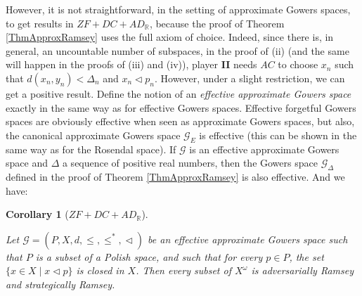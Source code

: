 \documentclass[a4paper,11pt]{article}
\newtheorem{cor}[thm]{Corollary}
\theoremstyle{definition}
\numberwithin{equation}{section}
\newcommand{\R}{\mathbb{R}}
\newcommand{\G}{\mathcal{G}}
\newcommand{\II}{\textbf{II}}
\begin{document}
However, it is not straightforward, in the setting of approximate Gowers spaces, to get results in $ZF + DC + AD_\R$, because the proof of Theorem \ref{ThmApproxRamsey} uses the full axiom of choice. Indeed, since there is, in general, an uncountable number of subspaces, in the proof of (ii) (and the same will happen in the proofs of (iii) and (iv)), player \II{} needs $AC$ to choose $x_n$ such that $d(x_n, y_n) < \Delta_n$ and $x_n \vartriangleleft p_n$. However, under a slight restriction, we can get a positive result. Define the notion of an \emph{effective approximate Gowers space} exactly in the same way as for effective Gowers spaces. Effective forgetful Gowers spaces are obviously effective when seen as approximate Gowers spaces, but also, the canonical approximate Gowers space $\G_E$ is effective (this can be shown in the same way as for the Rosendal space). If $\G$ is an effective approximate Gowers space and $\Delta$ a sequence of positive real numbers, then the Gowers space $\G_\Delta$ defined in the proof of Theorem \ref{ThmApproxRamsey} is also effective. And we have:

\begin{cor}[$ZF + DC + AD_\R$]\label{ApproxAD}

Let $\G = (P, X, d, \leqslant, \leqslant^*, \vartriangleleft)$ be an effective approximate Gowers space such that $P$ is a subset of a Polish space, and such that for every $p \in P$, the set $\{x \in X \mid x \vartriangleleft p\}$ is closed in $X$. Then every subset of $X^\omega$ is adversarially Ramsey and strategically Ramsey.

\end{cor}
\end{document}
